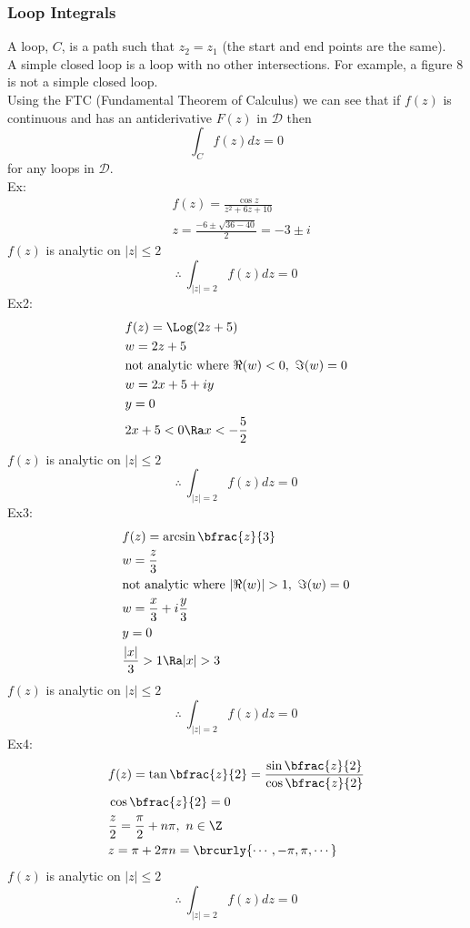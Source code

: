\subsubsection{Loop Integrals}
A loop, $C$, is a path such that $z_2=z_1$ (the start and end points are the same).\\
A simple closed loop is a loop with no other intersections. For example, a figure 8 is not a simple closed loop.\\
Using the FTC (Fundamental Theorem of Calculus) we can see that if $f(z)$ is continuous and has an antiderivative $F(z)$ in $\mathcal{D}$ then
\[\int_C f(z)dz=0\]
for any loops in $\mathcal{D}$.\\
Ex:
\begin{align*}
    &f(z)=\frac{\cos z}{z^2+6z+10}\\
    &z=\frac{-6\pm\sqrt{36-40}}{2}=-3\pm i
\end{align*}
$f(z)$ is analytic on $|z|\leq 2$
\[
\therefore\ \int_{|z|=2}f(z)dz=0
\]
Ex2:
\begin{align*}
    &f(z)=\Log(2z+5)\\
    &w=2z+5\\
    &\text{not analytic where }\Re(w)<0,\ \Im(w)=0\\
    &w=2x+5+iy\\
    &y=0\\
    &2x+5<0\Ra x<-\frac{5}{2}
\end{align*}
$f(z)$ is analytic on $|z|\leq 2$
\[
\therefore\ \int_{|z|=2}f(z)dz=0
\]
Ex3:
\begin{align*}
    &f(z)=\arcsin\bfrac{z}{3}\\
    &w=\frac{z}{3}\\
    &\text{not analytic where }|\Re(w)|>1,\ \Im(w)=0\\
    &w=\frac{x}{3}+i\frac{y}{3}\\
    &y=0\\
    &\frac{|x|}{3}>1\Ra |x|>3
\end{align*}
$f(z)$ is analytic on $|z|\leq 2$
\[
\therefore\ \int_{|z|=2}f(z)dz=0
\]
Ex4:
\begin{align*}
    &f(z)=\tan\bfrac{z}{2}=\frac{\sin\bfrac{z}{2}}{\cos\bfrac{z}{2}}\\
    &\cos\bfrac{z}{2}= 0\\
    &\frac{z}{2}=\frac{\pi}{2}+n\pi,\ n\in\Z\\
    &z=\pi+2\pi n=\brcurly{\cdots,-\pi,\pi,\cdots}
\end{align*}
$f(z)$ is analytic on $|z|\leq 2$
\[
\therefore\ \int_{|z|=2}f(z)dz=0
\]
